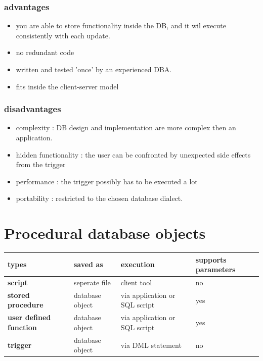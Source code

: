 \documentclass{report}
\begin{document}
			\subsubsection{advantages}
				\begin{itemize}
					\item you are able to store functionality inside the DB, and it wil execute consistently with each update.
					\item no redundant code 
					\item written and tested 'once' by an experienced DBA. 
					\item fits inside the client-server model
				\end{itemize}
			\subsubsection{disadvantages}
				\begin{itemize}
					\item complexity : DB design and implementation are more complex then an application.
					\item hidden functionality : the user can be confronted by unexpected side effects from the trigger
					\item performance : the trigger possibly has to be executed a lot
					\item portability : restricted to the chosen database dialect.
				\end{itemize}
		\section{Procedural database objects}
			\begin{center}
				\begin{tabular}{| m{12em} | m{7em} | m{13em} | m{11em} |}
					\hline
					\textbf{types} & \textbf{saved as} & \textbf{execution} & \textbf{supports parameters}\\
					\hline
					\textbf{script} & seperate file & client tool & no \\
					\hline
					\textbf{stored procedure} & database object & via application or SQL script & yes\\
					\hline
					\textbf{user defined function} & database object & via application or SQL script & yes\\
					\hline
					\textbf{trigger} & database object & via DML statement & no\\
					\hline
				\end{tabular}
			\end{center}
\end{document}
